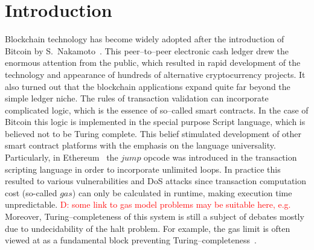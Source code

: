 \documentclass[runningheads]{llncs}
\newcommand{\dnote}[1]{\textcolor{red}{D: {#1}}}
\begin{document}
    \section{Introduction}
    Blockchain technology has become widely adopted after the introduction of
    Bitcoin by S.~Nakamoto~\cite{nakamoto2008bitcoin}. This peer--to--peer
    electronic cash ledger drew the enormous attention from the public, which
    resulted in rapid development of the technology and appearance of hundreds
    of alternative cryptocurrency projects. It also turned out that the
    blockchain applications expand quite far beyond the simple ledger niche. The
    rules of transaction validation can incorporate complicated logic, which is
    the essence of so--called smart contracts. In the case of Bitcoin this logic
    is implemented in the special purpose Script language, which is believed not
    to be Turing complete. This belief stimulated development of other smart
    contract platforms with the emphasis on the language universality.
    Particularly, in Ethereum~\cite{buterin2014next} the $jump$ opcode was
    introduced in the transaction scripting language in order to incorporate
    unlimited loops.
    In practice this resulted to various vulnerabilities and DoS attacks \cite{atzei2017survey}
    since transaction computation cost (so-called $gas$) can only be calculated in runtime,
    making execution time unpredictable. \dnote{some link to gas model problems may
    be suitable here, e.g. \cite{Earlz2017}}
	Moreover, Turing--completeness of this system is still a %
    subject of debates mostly due to undecidability of the halt problem.  For %
    example, the gas limit is often viewed at as a fundamental block preventing
    Turing--completeness~\cite{miller2016ethereum}.
\end{document}
